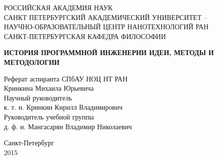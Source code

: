 \begin{titlepage}
\newpage

\begin{center}
РОССИЙСКАЯ АКАДЕМИЯ НАУК \\
САНКТ ПЕТЕРБУРГСКИЙ АКАДЕМИЧЕСКИЙ УНИВЕРСИТЕТ -- \\
НАУЧНО-ОБРАЗОВАТЕЛЬНЫЙ ЦЕНТР НАНОТЕХНОЛОГИЙ РАН \\
\vspace{1cm}
САНКТ-ПЕТЕРБУРГСКАЯ КАФЕДРА ФИЛОСОФИИ
\end{center}

\vspace{8em}

\begin{center}
\textbf{ИСТОРИЯ ПРОГРАММНОЙ ИНЖЕНЕРИИ \linebreak
ИДЕИ, МЕТОДЫ И МЕТОДОЛОГИИ}
\end{center}

\vspace{8em}

\begin{flushright}
Реферат аспиранта СПбАУ НОЦ НТ РАН \\
Кринкина Михаила Юрьевича \\
\vspace{1cm}
Научный руководитель \\
к. т. н. Кринкин Кирилл Владимирович \\
\vspace{1cm}
Руководитель учебной группы \\
д. ф. н. Мангасарян Владимир Николаевич \\
\end{flushright}

\vspace{\fill}
\begin{center}
Санкт-Петербург \\
2015
\end{center}
\end{titlepage}
